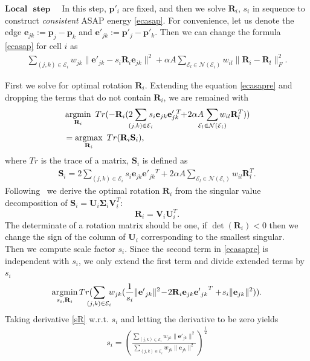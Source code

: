 $\textbf{Local}$ $\textbf{ step}$ ~~In this step, $\mathbf p'_i$ are fixed, and then we solve $\mathbf R_i$, $s_i$ in sequence to construct \emph{consistent} ASAP energy \eqref{ecasap}. For convenience, let us denote the edge $\mathbf e_{jk}:=\mathbf p_j-\mathbf p_k$ and $\mathbf e'_{jk}:=\mathbf p'_j-\mathbf p'_k$. Then we can change the formula \eqref{ecasap} for cell $i$ as
\begin{align}
\displaystyle \!\!\!\!\sum_{(j,k)\in\mathcal{E}_i}\!\!\!\!w_{jk}\|\mathbf e'_{jk}\!-\!s_i\!\mathbf R_i\mathbf e_{jk}\|^2\!+\!\alpha A\!\!\!\!\!\!\!\sum_{\mathcal{E}_l \in \mathcal{N}(\mathcal{E}_i)}\!\!\!\!\!\!w_{il}\|\mathbf R_i\!-\!\mathbf R_l\|_F^2 .\label{ecasapre}
\end{align}

First we solve for optimal rotation $\mathbf R_i$. Extending the equation \eqref{ecasapre} and dropping the terms that do not contain $\mathbf R_i$, we are remained with
\begin{align}
 &\argmin_{\mathbf R_i}~Tr(-\mathbf R_i(2\!\!\!\!\sum_{(j,k)\in\mathcal{E}_i}\!\!\!\!s_i\mathbf e_{jk}{\mathbf e'_{jk}}\!\!^T\!\!+\!2\alpha A\!\!\!\!\!\sum_{\mathcal{E}_l \in \mathcal{N}(\mathcal{E}_i)}\!\!\!\!\!\!w_{il}\mathbf R_l^T)) \nonumber\\
  &=\argmax_{\mathbf R_i}~Tr(\mathbf R_i\mathbf S_i),
\end{align}
where $Tr$ is the trace of a matrix, $\mathbf S_i$ is defined as
\begin{align*}
\mathbf S_i = 2\!\!\!\sum_{(j,k)\in\mathcal{E}_i}\!\!s_i\mathbf e_{jk}{\mathbf e'_{jk}}\!\!^T+2\alpha A\!\!\!\sum_{\mathcal{E}_l \in \mathcal{N}(\mathcal{E}_i)}\!\!\!\!\!\!w_{il}\mathbf R_l^T.
\end{align*}
Following~\cite{sorkine2007rigid} we derive the optimal rotation $\mathbf R_i$ from the singular value decomposition of $\mathbf S_i = \mathbf U_i\mathbf \Sigma_i\mathbf V_i^T$:
\begin{equation}\label{R}
\mathbf R_i = \mathbf V_i\mathbf U_i^T.
\end{equation}
The determinate of a rotation matrix should be one, if $\det(\mathbf R_i)<0$ then we change the sign of the column of $\mathbf U_i$ corresponding to the smallest singular.\\

Then we compute scale factor $s_i$. Since the second term in \eqref{ecasapre} is independent with $s_i$, we only extend the first term and divide extended terms by $s_i$
\begin{align}
 \argmin_{s_i,\mathbf R_i} Tr(\!\!\!\!\sum_{(j,k)\in\mathcal{E}_i}\!\!\!w_{jk}(\frac{1}{s_i}\|\mathbf {e'}_{jk}\|^2\!-\!2\mathbf R_i\mathbf e_{jk}{\mathbf {e'}_{jk}}^T + \!s_i\|\mathbf e_{jk}\|^2)). \label{sR}
\end{align}
Taking derivative \eqref{sR} w.r.t. $s_i$ and letting the derivative to be zero yields
\begin{align}\label{s}
s_i = {\left(\frac{\displaystyle \sum_{(j,k)\in\mathcal{E}_i}w_{jk}\|\mathbf e'_{jk}\|^2}{\displaystyle \sum_{(j,k)\in\mathcal{E}_i}w_{jk}\|\mathbf e_{jk}\|^2}\right)}^{\frac{1}{2}}
\end{align}\\

